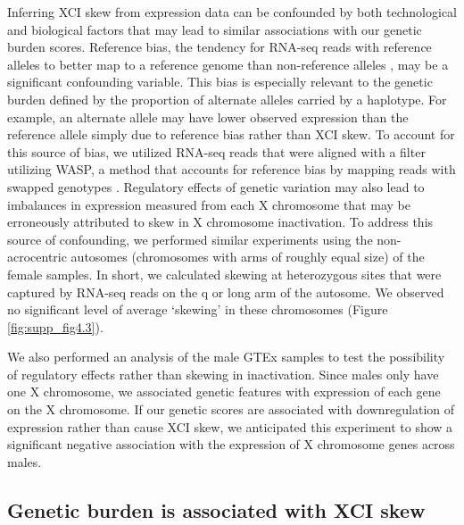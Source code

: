 


Inferring XCI skew from expression data can be confounded by both technological and biological factors that may lead to similar associations with our genetic burden scores. Reference bias, the tendency for RNA-seq reads with reference alleles to better map to a reference genome than non-reference alleles \cite{Stevenson2013-cg}, may be a significant confounding variable. This bias is especially relevant to the genetic burden defined by the proportion of alternate alleles carried by a haplotype. For example, an alternate allele may have lower observed expression than the reference allele simply due to reference bias rather than XCI skew. To account for this source of bias, we utilized RNA-seq reads that were aligned with a filter utilizing WASP, a method that accounts for reference bias by mapping reads with swapped genotypes \cite{Van_de_Geijn2015-oy}.
Regulatory effects of genetic variation may also lead to imbalances in expression measured from each X chromosome that may be erroneously attributed to skew in X chromosome inactivation. To address this source of confounding, we performed similar experiments using the non-acrocentric autosomes (chromosomes with arms of roughly equal size) of the female samples. In short, we calculated skewing at heterozygous sites that were captured by RNA-seq reads on the q or long arm of the autosome. We observed no significant level of average ‘skewing’ in these chromosomes (Figure \ref{fig:supp_fig4.3}). 



We also performed an analysis of the male GTEx samples to test the possibility of regulatory effects rather than skewing in inactivation. Since males only have one X chromosome, we associated genetic features with expression of each gene on the X chromosome. If our genetic scores are associated with downregulation of expression rather than cause XCI skew, we anticipated this experiment to show a significant negative association with the expression of X chromosome genes across males.

\subsection{Genetic burden is associated with XCI skew}

